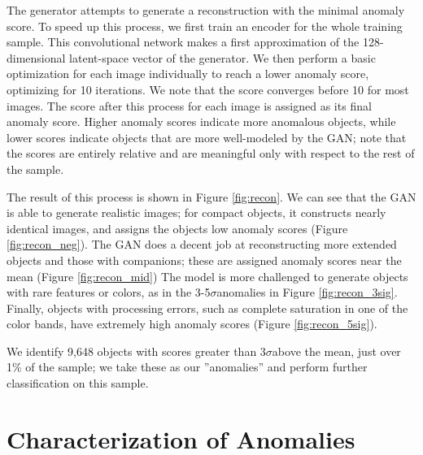 \documentclass{article}
\newcommand{\sig}{$\sigma$} %
\begin{document}
The generator attempts to generate a reconstruction with the minimal anomaly score.
To speed up this process, we first train an encoder for the whole training sample.
This convolutional network makes a first approximation of the 128-dimensional latent-space vector of the generator.
We then perform a basic optimization for each image individually to reach a lower anomaly score, optimizing for 10 iterations.
We note that the score converges before 10 for most images. %
The score after this process for each image is assigned as its final anomaly score.
Higher anomaly scores indicate more anomalous objects, while lower scores indicate objects that are more well-modeled by the GAN; note that the scores are entirely relative and are meaningful only with respect to the rest of the sample.

The result of this process is shown in Figure \ref{fig:recon}.
We can see that the GAN is able to generate realistic images; for compact objects, it constructs nearly identical images, and assigns the objects low anomaly scores (Figure \ref{fig:recon_neg}).
The GAN does a decent job at reconstructing more extended objects and those with companions; these are assigned anomaly scores near the mean (Figure \ref{fig:recon_mid})
The model is more challenged to generate objects with rare features or colors, as in the 3-5\sig anomalies in Figure \ref{fig:recon_3sig}.
Finally, objects with processing errors, such as complete saturation in one of the color bands, have extremely high anomaly scores (Figure \ref{fig:recon_5sig}).

We identify 9,648 objects with scores greater than 3\sig above the mean, just over 1\% of the sample; we take these as our ''anomalies'' and perform further classification on this sample.

\section{Characterization of Anomalies}
\label{charac}
\end{document}
